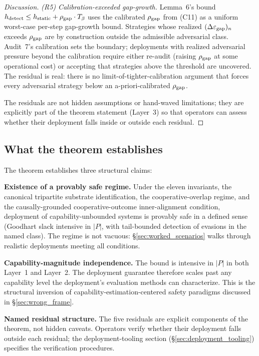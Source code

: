 \begin{proof}[Discussion]
\emph{(R5) Calibration-exceeded gap-growth.}  Lemma~6's bound
$h_{\mathrm{detect}} \leq h_{\mathrm{static}} + \rho_{\mathrm{gap}} \cdot
T_{\beta}$ uses the calibrated $\rho_{\mathrm{gap}}$ from (C11) as a uniform
worst-case per-step gap-growth bound.  Strategies whose realized
$(\Delta\varepsilon_{\mathrm{gap}})_n$ exceeds $\rho_{\mathrm{gap}}$ are by construction outside
the admissible adversarial class.  Audit~7's calibration sets the
boundary; deployments with realized adversarial pressure beyond
the calibration require either re-audit (raising $\rho_{\mathrm{gap}}$ at
some operational cost) or accepting that strategies above the
threshold are uncovered.  The residual is real: there is no
limit-of-tighter-calibration argument that forces every
adversarial strategy below an a-priori-calibrated $\rho_{\mathrm{gap}}$.

The residuals are not hidden assumptions or hand-waved limitations;
they are explicitly part of the theorem statement
(Layer~3) so that operators can assess whether their deployment
falls inside or outside each residual.
\end{proof}

\subsection{What the theorem establishes}
\label{sec:theorem_establishes}

The theorem establishes three structural claims:

\textbf{Existence of a provably safe regime.} Under the eleven invariants, the
canonical tripartite substrate identification, the cooperative-overlap regime,
and the causally-grounded cooperative-outcome inner-alignment condition,
deployment of capability-unbounded systems is provably safe in a defined sense
(Goodhart slack intensive in $|P|$, with tail-bounded detection of evasions in
the named class). The regime is not vacuous: \S\ref{sec:worked_scenarios} walks
through realistic deployments meeting all conditions.

\textbf{Capability-magnitude independence.} The bound is intensive
in $|P|$ in both Layer~1 and Layer~2. The deployment guarantee
therefore scales past any capability level the deployment's
evaluation methods can characterize. This is the structural
inversion of capability-estimation-centered safety paradigms
discussed in \S\ref{sec:wrong_frame}.

\textbf{Named residual structure.} The five residuals are explicit
components of the theorem, not hidden caveats.  Operators verify
whether their deployment falls outside each residual; the
deployment-tooling section (\S\ref{sec:deployment_tooling})
specifies the verification procedures.

